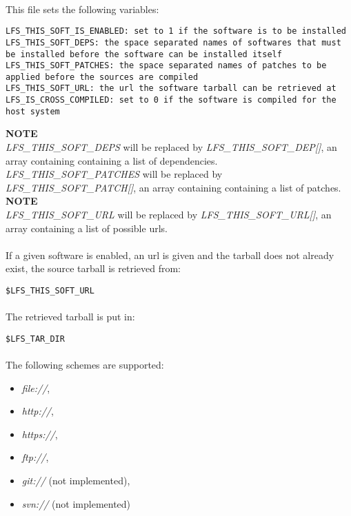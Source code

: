 \documentclass[a4paper, 11pt]{article}
\begin{document}
\paragraph{}
This file sets the following variables:\\

\begin{lstlisting}[frame=tb]
LFS_THIS_SOFT_IS_ENABLED: set to 1 if the software is to be installed
LFS_THIS_SOFT_DEPS: the space separated names of softwares that must
be installed before the software can be installed itself
LFS_THIS_SOFT_PATCHES: the space separated names of patches to be
applied before the sources are compiled
LFS_THIS_SOFT_URL: the url the software tarball can be retrieved at
LFS_IS_CROSS_COMPILED: set to 0 if the software is compiled for the
host system
\end{lstlisting}
\textbf{NOTE}\\
\textit{LFS\_THIS\_SOFT\_DEPS} will be replaced by
\textit{LFS\_THIS\_SOFT\_DEP[]}, an array containing containing a list of
dependencies.\\
\textit{LFS\_THIS\_SOFT\_PATCHES} will be replaced by
\textit{LFS\_THIS\_SOFT\_PATCH[]}, an array containing containing a list of
patches.\\
\textbf{NOTE}\\
\textit{LFS\_THIS\_SOFT\_URL} will be replaced by
\textit{LFS\_THIS\_SOFT\_URL[]}, an array containing a list of possible urls.

\paragraph{}
If a given software is enabled, an url is given and the tarball does not already
exist, the source tarball is retrieved from:\\

\begin{lstlisting}[frame=tb]
$LFS_THIS_SOFT_URL
\end{lstlisting}

\paragraph{}
The retrieved tarball is put in:\\
\begin{lstlisting}[frame=tb]
$LFS_TAR_DIR
\end{lstlisting}

\paragraph{}
The following schemes are supported:
\begin{itemize}
\item \textit{file://},
\item \textit{http://},
\item \textit{https://},
\item \textit{ftp://},
\item \textit{git://} (not implemented),
\item \textit{svn://} (not implemented)
\end{itemize}
\end{document}
